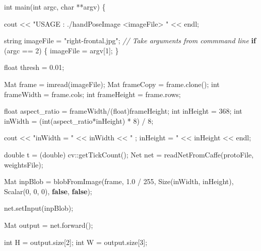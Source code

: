\documentclass[
  12pt,
  a4paper,
]{article}
\newenvironment{Shaded}{}{}
\newcommand{\CommentTok}[1]{\textcolor[rgb]{0.38,0.63,0.69}{\textit{#1}}}
\newcommand{\ControlFlowTok}[1]{\textcolor[rgb]{0.00,0.44,0.13}{\textbf{#1}}}
\newcommand{\DataTypeTok}[1]{\textcolor[rgb]{0.56,0.13,0.00}{#1}}
\newcommand{\DecValTok}[1]{\textcolor[rgb]{0.25,0.63,0.44}{#1}}
\newcommand{\FloatTok}[1]{\textcolor[rgb]{0.25,0.63,0.44}{#1}}
\newcommand{\KeywordTok}[1]{\textcolor[rgb]{0.00,0.44,0.13}{\textbf{#1}}}
\newcommand{\NormalTok}[1]{#1}
\newcommand{\StringTok}[1]{\textcolor[rgb]{0.25,0.44,0.63}{#1}}
\begin{document}
\begin{Shaded}
\begin{Highlighting}[numbers=left,,]
\DataTypeTok{int}\NormalTok{ main(}\DataTypeTok{int}\NormalTok{ argc, }\DataTypeTok{char}\NormalTok{ **argv)}
\NormalTok{\{}

\NormalTok{    cout \textless{}\textless{} }\StringTok{"USAGE : ./handPoseImage \textless{}imageFile\textgreater{} "}\NormalTok{ \textless{}\textless{} endl;}

\NormalTok{    string imageFile = }\StringTok{"right{-}frontal.jpg"}\NormalTok{;}
    \CommentTok{// Take arguments from commmand line}
    \ControlFlowTok{if}\NormalTok{ (argc == }\DecValTok{2}\NormalTok{)}
\NormalTok{    \{}
\NormalTok{      imageFile = argv[}\DecValTok{1}\NormalTok{];}
\NormalTok{    \}}

    \DataTypeTok{float}\NormalTok{ thresh = }\FloatTok{0.01}\NormalTok{;}

\NormalTok{    Mat frame = imread(imageFile);}
\NormalTok{    Mat frameCopy = frame.clone();}
    \DataTypeTok{int}\NormalTok{ frameWidth = frame.cols;}
    \DataTypeTok{int}\NormalTok{ frameHeight = frame.rows;}

    \DataTypeTok{float}\NormalTok{ aspect\_ratio = frameWidth/(}\DataTypeTok{float}\NormalTok{)frameHeight;}
    \DataTypeTok{int}\NormalTok{ inHeight = }\DecValTok{368}\NormalTok{;}
    \DataTypeTok{int}\NormalTok{ inWidth = (}\DataTypeTok{int}\NormalTok{(aspect\_ratio*inHeight) * }\DecValTok{8}\NormalTok{) / }\DecValTok{8}\NormalTok{;}

\NormalTok{    cout \textless{}\textless{} }\StringTok{"inWidth = "}\NormalTok{ \textless{}\textless{} inWidth \textless{}\textless{} }\StringTok{" ; inHeight = "}\NormalTok{ \textless{}\textless{} inHeight \textless{}\textless{} endl;}

    \DataTypeTok{double}\NormalTok{ t = (}\DataTypeTok{double}\NormalTok{) cv::getTickCount();}
\NormalTok{    Net net = readNetFromCaffe(protoFile, weightsFile);}

\NormalTok{    Mat inpBlob = blobFromImage(frame, }\FloatTok{1.0}\NormalTok{ / }\DecValTok{255}\NormalTok{, Size(inWidth, inHeight), Scalar(}\DecValTok{0}\NormalTok{, }\DecValTok{0}\NormalTok{, }\DecValTok{0}\NormalTok{), }\KeywordTok{false}\NormalTok{, }\KeywordTok{false}\NormalTok{);}

\NormalTok{    net.setInput(inpBlob);}

\NormalTok{    Mat output = net.forward();}

    \DataTypeTok{int}\NormalTok{ H = output.size[}\DecValTok{2}\NormalTok{];}
    \DataTypeTok{int}\NormalTok{ W = output.size[}\DecValTok{3}\NormalTok{];}


\end{Highlighting}
\end{Shaded}
\end{document}
